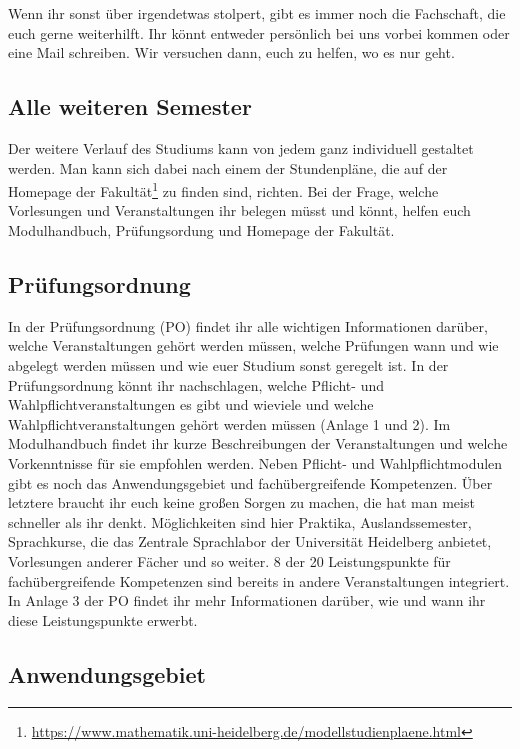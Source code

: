 Wenn ihr sonst über irgendetwas stolpert, gibt es immer noch die Fachschaft, die euch gerne weiterhilft. Ihr könnt entweder persönlich bei uns vorbei kommen oder eine Mail schreiben. Wir versuchen dann, euch zu helfen, wo es nur geht.

\subsection{Alle weiteren Semester}

Der weitere Verlauf des Studiums kann von jedem ganz individuell gestaltet werden. Man kann sich dabei nach einem der Stundenpläne, die auf der Homepage der Fakultät\footnote{\url{https://www.mathematik.uni-heidelberg.de/modellstudienplaene.html}} zu finden sind, richten. Bei der Frage, welche Vorlesungen und Veranstaltungen ihr belegen müsst und könnt, helfen euch Modulhandbuch, Prüfungsordung und Homepage der Fakultät.

\subsection{Prüfungsordnung}

In der Prüfungsordnung (PO) findet ihr alle wichtigen Informationen darüber, welche Veranstaltungen gehört werden müssen, welche Prüfungen wann und wie abgelegt werden müssen und wie euer Studium sonst geregelt ist.  In der Prüfungsordnung könnt ihr nachschlagen, welche Pflicht- und Wahlpflichtveranstaltungen es gibt und wieviele und welche Wahlpflichtveranstaltungen gehört werden müssen (Anlage 1 und 2).  Im Modulhandbuch findet ihr kurze Beschreibungen der Veranstaltungen und welche Vorkenntnisse für sie empfohlen werden.  Neben Pflicht- und Wahlpflichtmodulen gibt es noch das Anwendungsgebiet und fachübergreifende Kompetenzen.  Über letztere braucht ihr euch keine großen Sorgen zu machen, die hat man meist schneller als ihr denkt. Möglichkeiten sind hier Praktika, Auslandssemester, Sprachkurse, die das Zentrale Sprachlabor der Universität Heidelberg anbietet, Vorlesungen anderer Fächer und so weiter. 8 der 20 Leistungspunkte für fachübergreifende Kompetenzen sind bereits in andere Veranstaltungen integriert.  In Anlage 3 der PO findet ihr mehr Informationen darüber, wie und wann ihr diese Leistungspunkte erwerbt.


\subsection{Anwendungsgebiet}

